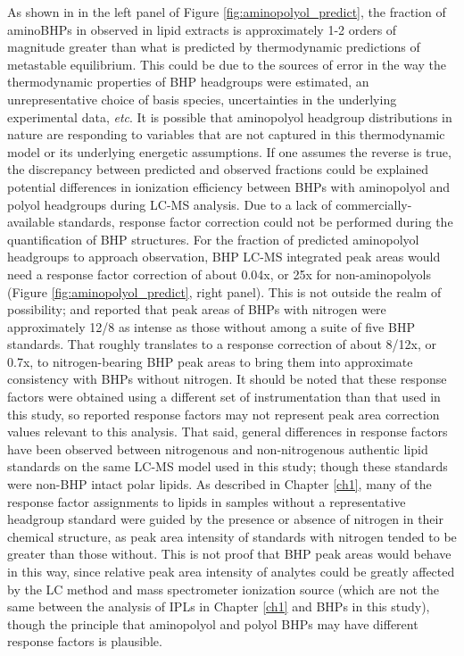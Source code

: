 As shown in in the left panel of Figure \ref{fig:aminopolyol_predict}, the fraction of aminoBHPs in observed in lipid extracts is approximately 1-2 orders of magnitude greater than what is predicted by thermodynamic predictions of metastable equilibrium. This could be due to the sources of error in the way the thermodynamic properties of BHP headgroups were estimated, an unrepresentative choice of basis species, uncertainties in the underlying experimental data, \textit{etc}. It is possible that aminopolyol headgroup distributions in nature are responding to variables that are not captured in this thermodynamic model or its underlying energetic assumptions. If one assumes the reverse is true, the discrepancy between predicted and observed fractions could be explained potential differences in ionization efficiency between BHPs with aminopolyol and polyol headgroups during LC-MS analysis. Due to a lack of commercially-available standards, response factor correction could not be performed during the quantification of BHP structures. For the fraction of predicted aminopolyol headgroups to approach observation, BHP LC-MS integrated peak areas would need a response factor correction of about 0.04x, or 25x for non-aminopolyols (Figure \ref{fig:aminopolyol_predict}, right panel). This is not outside the realm of possibility; \cite{cooke2008bacterial} and \cite{van2012bacteriohopanepolyol} reported that  peak areas of BHPs with nitrogen were approximately 12/8 as intense as those without among a suite of five BHP standards. That roughly translates to a response correction of about 8/12x, or 0.7x, to nitrogen-bearing BHP peak areas to bring them into approximate consistency with BHPs without nitrogen. It should be noted that these response factors were obtained using a different set of instrumentation than that used in this study, so reported response factors may not represent peak area correction values relevant to this analysis. That said, general differences in response factors have been observed between nitrogenous and non-nitrogenous authentic lipid standards on the same LC-MS model used in this study; though these standards were non-BHP intact polar lipids. As described in Chapter \ref{ch1}, many of the response factor assignments to lipids in samples without a representative headgroup standard were guided by the presence or absence of nitrogen in their chemical structure, as peak area intensity of standards with nitrogen tended to be greater than those without. This is not proof that BHP peak areas would behave in this way, since relative peak area intensity of analytes could be greatly affected by the LC method and mass spectrometer ionization source (which are not the same between the analysis of IPLs in Chapter \ref{ch1} and BHPs in this study), though the principle that aminopolyol and polyol BHPs may have different response factors is plausible.


